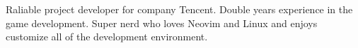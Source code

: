 

\begin{cvparagraph}
	Raliable project developer for company Tencent. Double years experience in the game development. Super nerd who loves Neovim and Linux and enjoys customize all of the development environment.
\end{cvparagraph}
